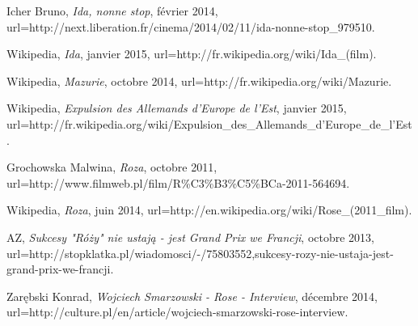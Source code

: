 \documentclass[12pt, twocolumn]{amsart}
\begin{document}
\begin{thebibliography}{100}
	Icher Bruno,
	\emph{Ida, nonne stop},
	février 2014,
	url=http://next.liberation.fr/cinema/2014/02/11/ida-nonne-stop\_979510.

	Wikipedia,
	\emph{Ida},
	janvier 2015,
	url=http://fr.wikipedia.org/wiki/Ida\_(film).

	Wikipedia,
	\emph{Mazurie},
	octobre 2014,
	url=http://fr.wikipedia.org/wiki/Mazurie.

	Wikipedia,
	\emph{Expulsion des Allemands d'Europe de l'Est},
	janvier 2015,
	url=http://fr.wikipedia.org/wiki/Expulsion\_des\_Allemands\_d'Europe\_de\_l'Est.

	Grochowska Malwina,
	\emph{Roza},
	octobre 2011,
	url=http://www.filmweb.pl/film/R\%C3\%B3\%C5\%BCa-2011-564694.

	Wikipedia,
	\emph{Roza},
	juin 2014,
	url=http://en.wikipedia.org/wiki/Rose\_(2011\_film).

	AZ,
	\emph{Sukcesy "Róży" nie ustają - jest Grand Prix we Francji},
	octobre 2013,
	url=http://stopklatka.pl/wiadomosci/-/75803552,sukcesy-rozy-nie-ustaja-jest-grand-prix-we-francji.

	Zarębski Konrad,
	\emph{Wojciech Smarzowski - Rose - Interview},
	décembre 2014,
	url=http://culture.pl/en/article/wojciech-smarzowski-rose-interview.

\end{thebibliography}
\end{document}
